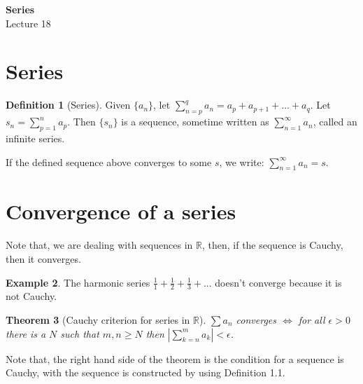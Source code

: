 \documentclass[12pt]{article}
\newcommand{\RR}{\mathbb{R}}   %
\newcommand{\abs}[1]{\left|#1\right|}
\theoremstyle{definition}
\newtheorem{definition}{Definition}[section]
\newtheorem{example}[definition]{Example}
\theoremstyle{plain}
\newtheorem{theorem}[definition]{Theorem}
\begin{document}

\begin{center}
    {\Large \textbf{Series}}\\[0.5em]
    {\large Lecture 18}
\end{center}

\tableofcontents

\newpage

\section{Series}
\begin{definition}[Series]
Given $\{a_n\}$, let $\sum_{n=p}^qa_n = a_p+a_{p+1}+...+a_{q}$. Let $s_n = \sum_{p=1}^na_p$. Then $\{s_n\}$ is a sequence, sometime written as $\sum_{n=1}^{\infty}a_n$, called an infinite series.
\end{definition}

\begin{note}
If the defined sequence above converges to some $s$, we write: $\sum_{n=1}^{\infty}a_n=s$.
\end{note}

\section{Convergence of a series}
\begin{note}
Note that, we are dealing with sequences in $\RR$, then, if the sequence is Cauchy, then it converges.
\end{note}

\begin{example}
The harmonic series $\frac{1}{1}+\frac{1}{2}+\frac{1}{3}+...$ doesn't converge because it is not Cauchy.
\end{example}

\begin{theorem}[Cauchy criterion for series in $\RR$]
$\sum a_n$ converges $\iff$ for all $\epsilon > 0$ there is a $N$ such that $m,n\ge N$ then $\abs{\sum_{k=n}^ma_k}<\epsilon$.
\end{theorem}

\begin{note}
Note that, the right hand side of the theorem is the condition for a sequence is Cauchy, with the sequence is constructed by using Definition 1.1.
\end{note}
\end{document}
